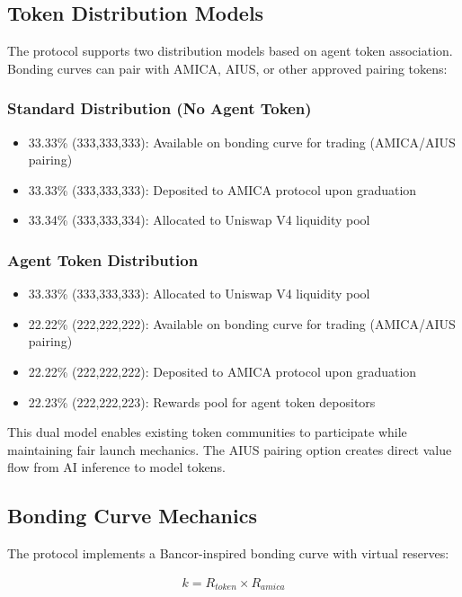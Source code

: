 \documentclass{article}
\begin{document}
\subsection{Token Distribution Models}

The protocol supports two distribution models based on agent token association. Bonding curves can pair with AMICA, AIUS, or other approved pairing tokens:

\subsubsection{Standard Distribution (No Agent Token)}
\begin{itemize}
    \item 33.33\% (333,333,333): Available on bonding curve for trading (AMICA/AIUS pairing)
    \item 33.33\% (333,333,333): Deposited to AMICA protocol upon graduation
    \item 33.34\% (333,333,334): Allocated to Uniswap V4 liquidity pool
\end{itemize}

\subsubsection{Agent Token Distribution}
\begin{itemize}
    \item 33.33\% (333,333,333): Allocated to Uniswap V4 liquidity pool
    \item 22.22\% (222,222,222): Available on bonding curve for trading (AMICA/AIUS pairing)
    \item 22.22\% (222,222,222): Deposited to AMICA protocol upon graduation
    \item 22.23\% (222,222,223): Rewards pool for agent token depositors
\end{itemize}

This dual model enables existing token communities to participate while maintaining fair launch mechanics. The AIUS pairing option creates direct value flow from AI inference to model tokens.

\subsection{Bonding Curve Mechanics}

The protocol implements a Bancor-inspired bonding curve with virtual reserves:

\begin{align}
k = R_{token} \times R_{amica}
\end{align}
\end{document}
